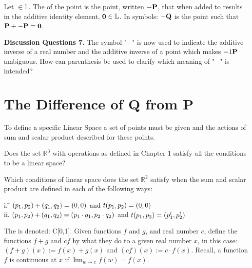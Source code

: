 \begin{defn}
	Let  $\in \mathbb{L}$. The  of the point  is the point, written $-\textbf{P}$, that when added to  results in the additive identity element, $\textbf{0}\in \mathbb{L}$. In symbols: $-\textbf{Q}$ is the point such that $\textbf{P} + -\textbf{P} = \textbf{0}$.
\end{defn}

\noindent \textbf{Discussion Questions 7.}
The symbol "$-$" is now used to indicate the additive inverse of a real number and the additive inverse of a point which makes $-1\textbf{P}$  ambiguous. How can parenthesis be used to clarify which meaning of "$-$" is intended?

\section{The Difference of Q from P  }    \label{The Difference of Q from P}

To define a specific Linear Space a set of points must be given and the actions of sum and scalar product described for these points.

\begin{myexa}[\bd{a}]
	Does the set $\mathbb{R}^3$ with operations as defined in Chapter 1 satisfy all the conditions to be a linear space?
\end{myexa}

\begin{myexb}[\bd{b}]
	Which conditions of linear space does the set $\mathbb{R}^2$ satisfy when the sum and scalar product are defined in each of the following ways:
	\begin{tabbing}
		\indent i. \quad  \= $({p_1},{p_2})+({q_1},{q_2}) = ({0},{0})$  and $t({p_1},{p_2}) = ({0},{0})$\\
		\indent ii. \> $({p_1},{p_2})+({q_1},{q_2}) = ({p_1 \cdot q_1},{p_2 \cdot q_2})$  and $t({p_1},{p_2}) = ({p_1^t},{p_2^t})$\\
	\end{tabbing}
\end{myexb}


     
\begin{defn}
	The  is denoted: C[0,1]. Given functions $f$ and $g$, and real number $c$, define the functions $f+g$ and $cf$ by what they do to a given real number $x$, in this case: $(f+g)(x):=f(x) +g(x)$ and $(cf)(x) := c \cdot f(x)$. Recall, a function $f$ is continuous at $x$ if $\lim_{w \rightarrow x}  f(w) = f(x).$
\end{defn}     

